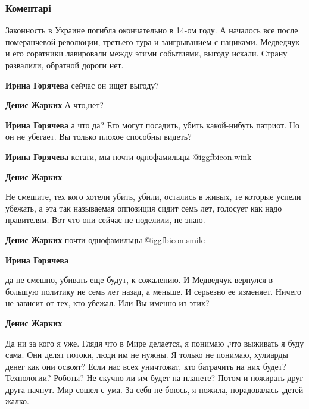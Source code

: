  
 
 
 
 
\subsubsection{Коментарі}

\begin{itemize} %

Законность в Украине погибла окончательно в 14-ом году. А началось все после
померанчевой революции, третьего тура и заигрыванием с нациками. Медведчук и его
соратники лавировали между этими событиями, выгоду искали. Страну
развалили, обратной дороги нет.

\begin{itemize} %
\textbf{Ирина Горячева} сейчас он ищет выгоду?

\textbf{Денис Жарких} А что,нет?

\textbf{Ирина Горячева} а что да? Его могут посадить, убить какой-нибуть патриот. Но он не убегает. Вы только плохое способны видеть?

\textbf{Ирина Горячева} кстати, мы почти однофамильцы  @igg{fbicon.wink} 

\textbf{Денис Жарких} 

Не смешите, тех кого хотели убить, убили, остались в живых, те которые успели
убежать, а эта так называемая оппозиция сидит семь лет, голосует как надо
правителям. Вот что они сейчас не поделили, не знаю.

\textbf{Денис Жарких} почти однофамильцы  @igg{fbicon.smile} 

\textbf{Ирина Горячева} 

да не смешно, убивать еще будут, к сожалению. И Медведчук вернулся в большую
политику не семь лет назад, а меньше. И серьезно ее изменяет. Ничего не зависит
от тех, кто убежал. Или Вы именно из этих?

\textbf{Денис Жарких} 

Да ни за кого я уже. Глядя что в Мире делается, я понимаю ,что выживать я буду
сама. Они делят потоки, люди им не нужны. Я только не понимаю, хулиарды денег как
они освоят? Если нас всех уничтожат, кто батрачить на них будет? Технологии?
Роботы? Не скучно ли им будет на планете? Потом и пожирать друг друга начнут.
Мир сошел с ума. За себя не боюсь, я пожила, порадовалась ,детей жалко.


\end{itemize}
\end{itemize}
